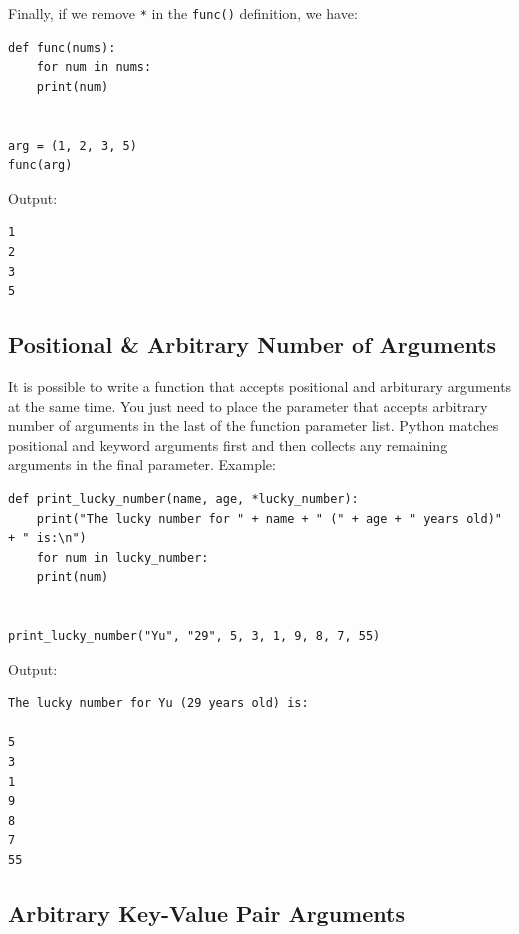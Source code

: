 \documentclass[12pt]{book}
\begin{document}
Finally, if we remove \texttt{*} in the \texttt{func()} definition, we have:
\begin{verbatim}
def func(nums):
    for num in nums:
	print(num)


arg = (1, 2, 3, 5)
func(arg)
\end{verbatim}
Output:
\begin{verbatim}
1
2
3
5
\end{verbatim}

\subsection{Positional \& Arbitrary Number of Arguments}
\label{sec:org18f99bb}
It is possible to write a function that accepts positional and arbiturary arguments at the same time. You just need to place the parameter that accepts arbitrary number of arguments in the last of the function parameter list. Python matches positional and keyword arguments first and then collects any remaining arguments in the final parameter. Example:
\begin{verbatim}
def print_lucky_number(name, age, *lucky_number):
    print("The lucky number for " + name + " (" + age + " years old)" + " is:\n")
    for num in lucky_number:
	print(num)


print_lucky_number("Yu", "29", 5, 3, 1, 9, 8, 7, 55)
\end{verbatim}
Output:
\begin{verbatim}
The lucky number for Yu (29 years old) is:

5
3
1
9
8
7
55
\end{verbatim}

\subsection{Arbitrary Key-Value Pair Arguments}
\label{sec:org420c9e8}
\end{document}

